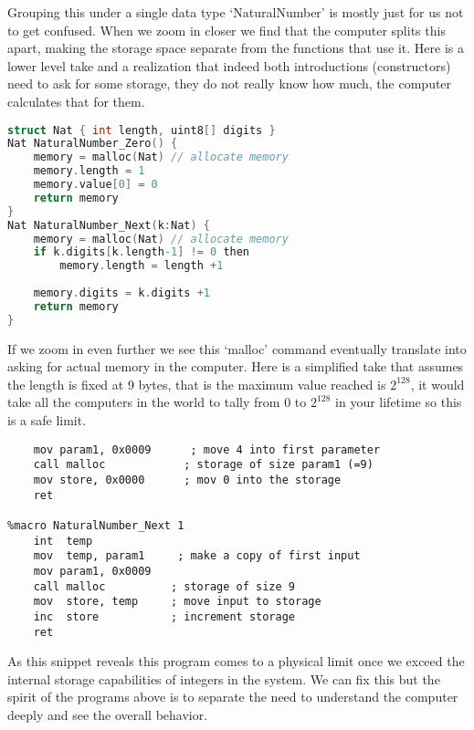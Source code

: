 Grouping this under a single data type `NaturalNumber'
is mostly just for us not to get confused.  When we 
zoom in closer we find that the computer splits 
this apart, making the storage space separate from the 
functions that use it.  Here is a lower level take
and a realization that indeed both introductions (constructors)
need to ask for some storage, they do not really know 
how much, the computer calculates that for them.
\begin{center}
\begin{lstlisting}[language=C]
struct Nat { int length, uint8[] digits }
Nat NaturalNumber_Zero() { 
    memory = malloc(Nat) // allocate memory
    memory.length = 1
    memory.value[0] = 0
    return memory 
}
Nat NaturalNumber_Next(k:Nat) {
    memory = malloc(Nat) // allocate memory
    if k.digits[k.length-1] != 0 then
        memory.length = length +1
    
    memory.digits = k.digits +1
    return memory 
}
\end{lstlisting}
\end{center}

If we zoom in even further we see this `malloc' command eventually 
translate into asking for actual memory in the computer.  Here is a
simplified take that assumes the length is fixed at 9 bytes, that is 
the maximum value reached is $2^{128}$, it would take all the computers 
in the world to tally from $0$ to $2^{128}$ in your lifetime so 
this is a safe limit.
\begin{center}
\begin{lstlisting}[language={ [x86masm]Assembler}]
%macro NaturalNumber_Zero 0
    mov param1, 0x0009      ; move 4 into first parameter
    call malloc            ; storage of size param1 (=9)
    mov store, 0x0000      ; mov 0 into the storage
    ret 

%macro NaturalNumber_Next 1
    int  temp
    mov  temp, param1     ; make a copy of first input
    mov param1, 0x0009      
    call malloc          ; storage of size 9
    mov  store, temp     ; move input to storage
    inc  store           ; increment storage 
    ret 
\end{lstlisting}
\end{center}

As this snippet reveals this program comes to a physical limit 
once we exceed the internal storage capabilities of integers in the
system.  We can fix this but the spirit of the programs above 
is to separate the need to understand the computer deeply and see the 
overall behavior.



